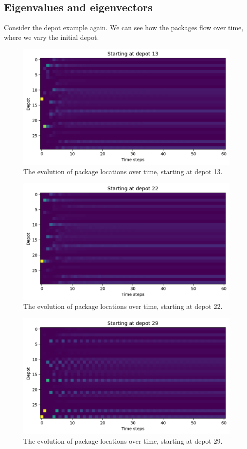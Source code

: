 \documentclass[a4paper, openany]{memoir}
\begin{document}
    \subsection{Eigenvalues and eigenvectors}
    Consider the depot example again. We can see how the packages flow over time, where we vary the initial depot.
    \begin{figure}[H]
        \centering
        \includegraphics[scale=0.4]{src/3.24 Start at 13.png}
        \caption{The evolution of package locations over time, starting at depot 13.}
    \end{figure}
    \begin{figure}[H]
        \centering
        \includegraphics[scale=0.4]{src/3.25 Start at 22.png}
        \caption{The evolution of package locations over time, starting at depot 22.}
    \end{figure}
    \begin{figure}[H]
        \centering
        \includegraphics[scale=0.4]{src/3.26 Start at 29.png}
        \caption{The evolution of package locations over time, starting at depot 29.}
    \end{figure}
\end{document}
